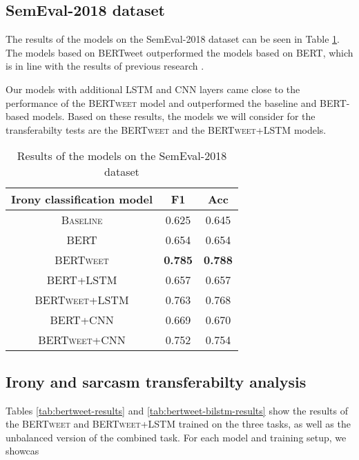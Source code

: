 \documentclass[10pt, a4paper]{article}
\begin{document}
\subsection{SemEval-2018 dataset}\label{semeval-results}

The results of the models on the SemEval-2018 dataset can be seen in Table \ref{tab:semeval-2018}. The models based on
BERTweet outperformed the models based on BERT, which is in line with the results of previous research \citep{bertweet}.

Our models with additional LSTM and CNN layers came close to the performance of the \textsc{BERTweet} model and outperformed
the baseline and BERT-based models. Based on these results, the models we will consider for the transferabilty tests are the
\textsc{BERTweet} and the \textsc{BERTweet+LSTM} models.

\begin{table}[h]
   \caption{Results of the models on the SemEval-2018 dataset}
   \label{tab:semeval-2018}
   \begin{center}
   \begin{tabular}{|c|c|c|}
   \toprule
   Irony classification model & F1 & Acc\\
   \midrule
   \textsc{Baseline} & 0.625 & 0.645 \\
   \textsc{BERT} & 0.654 & 0.654 \\
   \textsc{BERTweet} & \textbf{0.785} & \textbf{0.788} \\
   \textsc{BERT+LSTM} & 0.657 & 0.657 \\
   \textsc{BERTweet+LSTM} & 0.763 & 0.768 \\
   \textsc{BERT+CNN} & 0.669 & 0.670 \\
   \textsc{BERTweet+CNN} & 0.752 & 0.754 \\
   \bottomrule
   \end{tabular}
   \end{center}
\end{table}

\subsection{Irony and sarcasm transferabilty analysis}\label{task-analysis}

Tables \ref{tab:bertweet-results} and \ref{tab:bertweet-bilstm-results} show the results of the \textsc{BERTweet} and
\textsc{BERTweet+LSTM} trained on the three tasks, as well as the unbalanced version of the combined task. For each model
and training setup, we showcas
\end{document}
